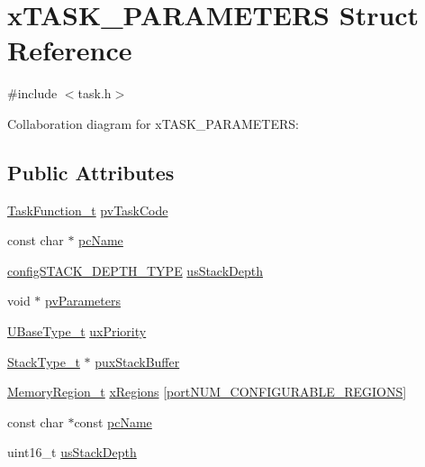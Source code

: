 \hypertarget{structx_t_a_s_k___p_a_r_a_m_e_t_e_r_s}{}\section{x\+T\+A\+S\+K\+\_\+\+P\+A\+R\+A\+M\+E\+T\+E\+RS Struct Reference}
\label{structx_t_a_s_k___p_a_r_a_m_e_t_e_r_s}


{\ttfamily \#include $<$task.\+h$>$}



Collaboration diagram for x\+T\+A\+S\+K\+\_\+\+P\+A\+R\+A\+M\+E\+T\+E\+RS\+:
\subsection*{Public Attributes}
\begin{DoxyCompactItemize}
\item 
\hyperlink{vendor_2ceedling_2plugins_2freertos_2vendor_2freertos_2include_2projdefs_8h_a9b32502ff92c255c686dacde53c1cba0}{Task\+Function\+\_\+t} \hyperlink{structx_t_a_s_k___p_a_r_a_m_e_t_e_r_s_a7527993402054565cda38251c8922880}{pv\+Task\+Code}
\item 
const char $\ast$ \hyperlink{structx_t_a_s_k___p_a_r_a_m_e_t_e_r_s_a28968e08d268bf826f757a886c796525}{pc\+Name}
\item 
\hyperlink{externals_2freertos_2include_2_free_r_t_o_s_8h_ae4e85bffd36d76cf2796092f0ccd784a}{config\+S\+T\+A\+C\+K\+\_\+\+D\+E\+P\+T\+H\+\_\+\+T\+Y\+PE} \hyperlink{structx_t_a_s_k___p_a_r_a_m_e_t_e_r_s_aa07bfb2214d78ba7a30592fa7b75af18}{us\+Stack\+Depth}
\item 
void $\ast$ \hyperlink{structx_t_a_s_k___p_a_r_a_m_e_t_e_r_s_a0b116e4ace0d2dbce4267380ebe822fd}{pv\+Parameters}
\item 
\hyperlink{externals_2freertos_2portable_2_g_c_c_2_a_r_m___c_m0_2portmacro_8h_a646f89d4298e4f5afd522202b11cb2e6}{U\+Base\+Type\+\_\+t} \hyperlink{structx_t_a_s_k___p_a_r_a_m_e_t_e_r_s_aa1aff14035db645e2bdcc85b3cdc9bab}{ux\+Priority}
\item 
\hyperlink{externals_2freertos_2portable_2_g_c_c_2_a_r_m___c_m0_2portmacro_8h_a84e9a8ba132feed0b2401c1f4e2ac63c}{Stack\+Type\+\_\+t} $\ast$ \hyperlink{structx_t_a_s_k___p_a_r_a_m_e_t_e_r_s_a2a1e05eb71b16db21ebcea50066fb303}{pux\+Stack\+Buffer}
\item 
\hyperlink{externals_2freertos_2include_2task_8h_af609504de4d78ff6f71477ae47c66e51}{Memory\+Region\+\_\+t} \hyperlink{structx_t_a_s_k___p_a_r_a_m_e_t_e_r_s_a9641d492bae4c00132842f54700f9fcc}{x\+Regions} \mbox{[}\hyperlink{vendor_2ceedling_2plugins_2freertos_2vendor_2freertos_2include_2portable_8h_aca7e1a8a568a38b74cc9db10c8efebda}{port\+N\+U\+M\+\_\+\+C\+O\+N\+F\+I\+G\+U\+R\+A\+B\+L\+E\+\_\+\+R\+E\+G\+I\+O\+NS}\mbox{]}
\item 
const char $\ast$const \hyperlink{structx_t_a_s_k___p_a_r_a_m_e_t_e_r_s_a7b3e5583acf9de8bacac572a42246459}{pc\+Name}
\item 
uint16\+\_\+t \hyperlink{structx_t_a_s_k___p_a_r_a_m_e_t_e_r_s_aa07bfb2214d78ba7a30592fa7b75af18}{us\+Stack\+Depth}
\end{DoxyCompactItemize}


